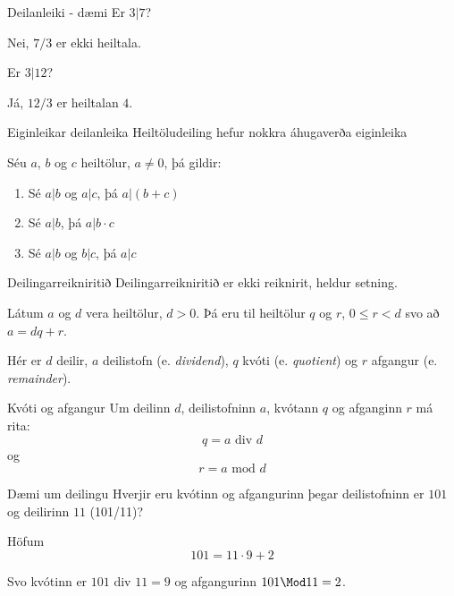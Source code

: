 \documentclass[handout]{beamer}
\begin{document}
\begin{frame}{Deilanleiki - dæmi}
Er $3|7$? \pause

Nei, $7/3$ er ekki heiltala. \pause

\vspace{0.5cm}
Er $3|12$? \pause

Já, $12/3$ er heiltalan $4$.
\end{frame}

\begin{frame}{Eiginleikar deilanleika}
Heiltöludeiling hefur nokkra áhugaverða eiginleika
\begin{tcolorbox}[title=Eiginleikar deilanleika]
Séu $a$, $b$ og $c$ heiltölur, $a \neq 0$, þá gildir:
\begin{enumerate}
 \item Sé $a|b$ og $a|c$, þá $a|(b+c)$
 \item Sé $a|b$, þá $a|b\cdot c$
 \item Sé $a|b$ og $b|c$, þá $a|c$
\end{enumerate}
\end{tcolorbox}
\end{frame}

\begin{frame}{Deilingarreikniritið}
Deilingarreikniritið er ekki reiknirit, heldur setning.

\begin{tcolorbox}[title=Deilingarreikniritið]
Látum $a$ og $d$ vera heiltölur, $d > 0$. 
Þá eru til heiltölur $q$ og $r$, $0 \leq r < d$ svo að $a = dq +r$.
\end{tcolorbox}

Hér er $d$ deilir, $a$ deilistofn (e. \emph{dividend}), $q$ kvóti (e. \emph{quotient}) og $r$ afgangur (e. \emph{remainder}).
\end{frame}


\begin{frame}{Kvóti og afgangur}
Um deilinn $d$, deilistofninn $a$, kvótann $q$ og afganginn $r$ má rita:
\[
 q = a \text{ div } d
\]
og
\[
 r = a \text{ mod } d
\]
\end{frame}

\begin{frame}{Dæmi um deilingu}
Hverjir eru kvótinn og afgangurinn þegar deilistofninn er $101$ og deilirinn $11$ (101/11)? \pause

Höfum
\[
 101 = 11 \cdot 9 + 2
\]

Svo kvótinn er $101 \text{ div } 11 = 9$ og afgangurinn $101 \Mod 11 = 2$.

\end{frame}
\end{document}
